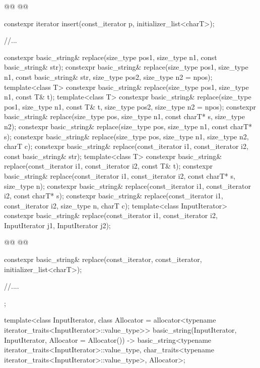 \documentclass{wg21}
\begin{document}
\begin{codeblock}
{{        @@
        @@

        constexpr iterator insert(const_iterator p, initializer_list<charT>);

        //...

        constexpr basic_string& replace(size_type pos1, size_type n1, const basic_string& str);
        constexpr basic_string& replace(size_type pos1, size_type n1, const basic_string& str,
        size_type pos2, size_type n2 = npos);
        template<class T>
        constexpr basic_string& replace(size_type pos1, size_type n1, const T& t);
        template<class T>
        constexpr basic_string& replace(size_type pos1, size_type n1, const T& t,
        size_type pos2, size_type n2 = npos);
        constexpr basic_string& replace(size_type pos, size_type n1, const charT* s, size_type n2);
        constexpr basic_string& replace(size_type pos, size_type n1, const charT* s);
        constexpr basic_string& replace(size_type pos, size_type n1, size_type n2, charT c);
        constexpr basic_string& replace(const_iterator i1, const_iterator i2,
        const basic_string& str);
        template<class T>
        constexpr basic_string& replace(const_iterator i1, const_iterator i2, const T& t);
        constexpr basic_string& replace(const_iterator i1, const_iterator i2, const charT* s,
        size_type n);
        constexpr basic_string& replace(const_iterator i1, const_iterator i2, const charT* s);
        constexpr basic_string& replace(const_iterator i1, const_iterator i2, size_type n, charT c);
        template<class InputIterator>
        constexpr basic_string& replace(const_iterator i1, const_iterator i2,
            InputIterator j1, InputIterator j2);

        @@
        @@

        constexpr basic_string& replace(const_iterator, const_iterator, initializer_list<charT>);

        //....
    };

    template<class InputIterator,
    class Allocator = allocator<typename iterator_traits<InputIterator>::value_type>>
    basic_string(InputIterator, InputIterator, Allocator = Allocator())
    -> basic_string<typename iterator_traits<InputIterator>::value_type,
    char_traits<typename iterator_traits<InputIterator>::value_type>,
    Allocator>;


}
\end{codeblock}
\end{document}

